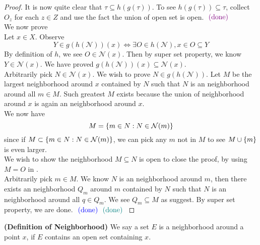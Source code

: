 \documentclass{report}
\begin{document}
\begin{proof}
It is now quite clear that $\tau \subseteq h(g(\tau))$. To see $h(g(\tau))\subseteq \tau$, collect $O_z$ for each  $z\in Z$ and use the fact the union of open set is open. $\textcolor{violet}{\text{ (done) }}$\\

We now prove \\

Let $x\in X$. Observe
\begin{equation}
Y \in g(h(\mathcal{N}))(x)\iff  \exists O \in h(\mathcal{N}),x \in O \subseteq Y
\label{1}
\end{equation}
By definition of $h$, we see $O\in \mathcal{N}(x)$. Then by super set property, we know $Y \in \mathcal{N}(x)$. We have proved $ g(h(\mathcal{N}))(x)\subseteq \mathcal{N}(x)$.\\

Arbitrarily pick $N\in \mathcal{N}(x)$. We wish to prove $N\in g(h(\mathcal{N}))$. Let $M$ be the largest neighborhood around  $x$ contained by $N$ such that  $N$ is an neighborhood around all  $m \in M$. Such greatest $M$ exists because the union of neighborhood  around  $x$ is again an neighborhood around  $x$.\\

We now have 
\begin{equation*}
M=\{ m\in N:N\in \mathcal{N}(m) \}
\label{2}
\end{equation*}
since if $M\subset \{ m \in N:N\in \mathcal{N}(m) \}$, we can pick any $m$  not in $M$ to see  $M\cup \{ m \}$ is even larger.\\

We wish to show the neighborhood $M\subseteq N$ is open to close the proof, by using $M=O$ in .\\

Arbitrarily pick $m \in M$. We know $N$ is an neighborhood around  $m$, then there exists an neighborhood $Q_m$ around $m$ contained by $N$ such that $N$ is an neighborhood around all  $q\in Q_m$. We see $Q_m\subseteq M$ as  suggest. By super set property, we are done. $\textcolor{blue}{\text{ (done) }} \textcolor{teal}{\text{ (done) }}$
\end{proof}
\begin{definition}
\label{2.1.6}
\textbf{(Definition of Neighborhood)} We say a set $E$ is a neighborhood around a point $x$, if  $E$ contains an  open set containing $x$.
\end{definition}
\end{document}
